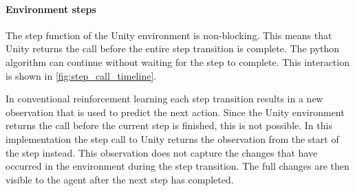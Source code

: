 \paragraph{Environment steps}
\label{sec:non_blocking_step_calls}

The step function of the Unity environment is non-blocking. This means that Unity returns the call before the entire step transition is complete. The python algorithm can continue without waiting for the step to complete. This interaction is shown in \ref{fig:step_call_timeline}.

In conventional reinforcement learning each step transition results in a new observation that is used to predict the next action. Since the Unity environment returns the call before the current step is finished, this is not possible. In this implementation the step call to Unity returns the observation from the start of the step instead. This observation does not capture the changes that have occurred in the environment during the step transition. The full changes are then visible to the agent after the next step has completed. 



\newcommand\po{-3}

\newcommand\fo{-5}

